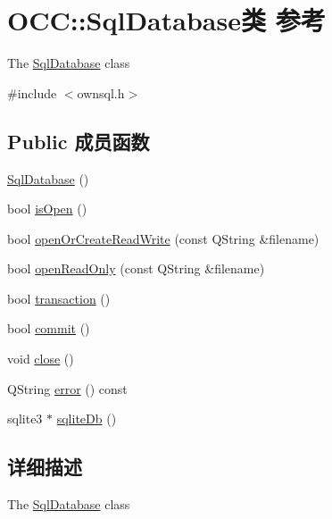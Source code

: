 \hypertarget{class_o_c_c_1_1_sql_database}{}\section{O\+CC\+:\+:Sql\+Database类 参考}
\label{class_o_c_c_1_1_sql_database}


The \hyperlink{class_o_c_c_1_1_sql_database}{Sql\+Database} class  




{\ttfamily \#include $<$ownsql.\+h$>$}

\subsection*{Public 成员函数}
\begin{DoxyCompactItemize}
\item 
\hyperlink{class_o_c_c_1_1_sql_database_a27fa6a7b04f4e4e936d5105bef3cb37f}{Sql\+Database} ()
\item 
bool \hyperlink{class_o_c_c_1_1_sql_database_a3b6b2acfbce1fe5c668e18a8fae91273}{is\+Open} ()
\item 
bool \hyperlink{class_o_c_c_1_1_sql_database_aa92cbe3a3eaafc1a77f72461679b1f36}{open\+Or\+Create\+Read\+Write} (const Q\+String \&filename)
\item 
bool \hyperlink{class_o_c_c_1_1_sql_database_a372f988d2b4a9d2be460e2b80d9fca94}{open\+Read\+Only} (const Q\+String \&filename)
\item 
bool \hyperlink{class_o_c_c_1_1_sql_database_a4d06c7545e0a10d6957e972bc65e8215}{transaction} ()
\item 
bool \hyperlink{class_o_c_c_1_1_sql_database_a891011e23d7101f3ffacc64e98f50327}{commit} ()
\item 
void \hyperlink{class_o_c_c_1_1_sql_database_a958a7c611b39d922baffc011a676255d}{close} ()
\item 
Q\+String \hyperlink{class_o_c_c_1_1_sql_database_a7baccf83efde252eee1829c10815c99f}{error} () const
\item 
sqlite3 $\ast$ \hyperlink{class_o_c_c_1_1_sql_database_a5123d8afeb0c8efa2c538fdfd125b4b4}{sqlite\+Db} ()
\end{DoxyCompactItemize}


\subsection{详细描述}
The \hyperlink{class_o_c_c_1_1_sql_database}{Sql\+Database} class 

